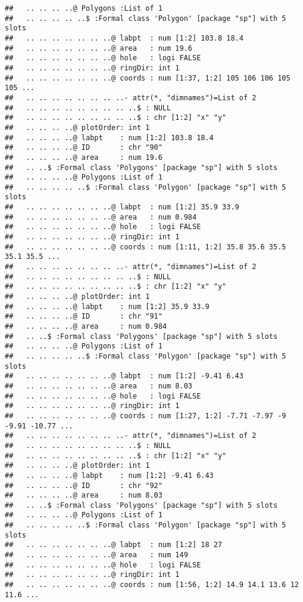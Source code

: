 \documentclass[]{article}
\begin{document}
\begin{verbatim}
##   .. .. .. ..@ Polygons :List of 1
##   .. .. .. .. ..$ :Formal class 'Polygon' [package "sp"] with 5 slots
##   .. .. .. .. .. .. ..@ labpt  : num [1:2] 103.8 18.4
##   .. .. .. .. .. .. ..@ area   : num 19.6
##   .. .. .. .. .. .. ..@ hole   : logi FALSE
##   .. .. .. .. .. .. ..@ ringDir: int 1
##   .. .. .. .. .. .. ..@ coords : num [1:37, 1:2] 105 106 106 105 105 ...
##   .. .. .. .. .. .. .. ..- attr(*, "dimnames")=List of 2
##   .. .. .. .. .. .. .. .. ..$ : NULL
##   .. .. .. .. .. .. .. .. ..$ : chr [1:2] "x" "y"
##   .. .. .. ..@ plotOrder: int 1
##   .. .. .. ..@ labpt    : num [1:2] 103.8 18.4
##   .. .. .. ..@ ID       : chr "90"
##   .. .. .. ..@ area     : num 19.6
##   .. ..$ :Formal class 'Polygons' [package "sp"] with 5 slots
##   .. .. .. ..@ Polygons :List of 1
##   .. .. .. .. ..$ :Formal class 'Polygon' [package "sp"] with 5 slots
##   .. .. .. .. .. .. ..@ labpt  : num [1:2] 35.9 33.9
##   .. .. .. .. .. .. ..@ area   : num 0.984
##   .. .. .. .. .. .. ..@ hole   : logi FALSE
##   .. .. .. .. .. .. ..@ ringDir: int 1
##   .. .. .. .. .. .. ..@ coords : num [1:11, 1:2] 35.8 35.6 35.5 35.1 35.5 ...
##   .. .. .. .. .. .. .. ..- attr(*, "dimnames")=List of 2
##   .. .. .. .. .. .. .. .. ..$ : NULL
##   .. .. .. .. .. .. .. .. ..$ : chr [1:2] "x" "y"
##   .. .. .. ..@ plotOrder: int 1
##   .. .. .. ..@ labpt    : num [1:2] 35.9 33.9
##   .. .. .. ..@ ID       : chr "91"
##   .. .. .. ..@ area     : num 0.984
##   .. ..$ :Formal class 'Polygons' [package "sp"] with 5 slots
##   .. .. .. ..@ Polygons :List of 1
##   .. .. .. .. ..$ :Formal class 'Polygon' [package "sp"] with 5 slots
##   .. .. .. .. .. .. ..@ labpt  : num [1:2] -9.41 6.43
##   .. .. .. .. .. .. ..@ area   : num 8.03
##   .. .. .. .. .. .. ..@ hole   : logi FALSE
##   .. .. .. .. .. .. ..@ ringDir: int 1
##   .. .. .. .. .. .. ..@ coords : num [1:27, 1:2] -7.71 -7.97 -9 -9.91 -10.77 ...
##   .. .. .. .. .. .. .. ..- attr(*, "dimnames")=List of 2
##   .. .. .. .. .. .. .. .. ..$ : NULL
##   .. .. .. .. .. .. .. .. ..$ : chr [1:2] "x" "y"
##   .. .. .. ..@ plotOrder: int 1
##   .. .. .. ..@ labpt    : num [1:2] -9.41 6.43
##   .. .. .. ..@ ID       : chr "92"
##   .. .. .. ..@ area     : num 8.03
##   .. ..$ :Formal class 'Polygons' [package "sp"] with 5 slots
##   .. .. .. ..@ Polygons :List of 1
##   .. .. .. .. ..$ :Formal class 'Polygon' [package "sp"] with 5 slots
##   .. .. .. .. .. .. ..@ labpt  : num [1:2] 18 27
##   .. .. .. .. .. .. ..@ area   : num 149
##   .. .. .. .. .. .. ..@ hole   : logi FALSE
##   .. .. .. .. .. .. ..@ ringDir: int 1
##   .. .. .. .. .. .. ..@ coords : num [1:56, 1:2] 14.9 14.1 13.6 12 11.6 ...

\end{verbatim}
\end{document}
